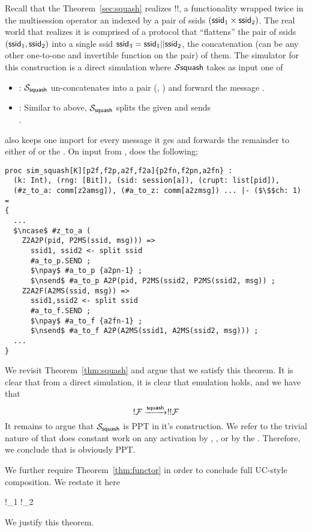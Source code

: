 Recall that the Theorem~\ref{sec:squash} realizes !!\F, a functionality wrapped twice in the multisession operator an indexed by a pair of ssids $(\mathsf{ssid}_1 \times \mathsf{ssid}_2)$.
The real world that realizes it is comprised of a protocol that ``flattens'' the pair of ssids $(\mathsf{ssid}_1, \mathsf{ssid}_2)$ into a single ssid $\mathsf{ssid}_3 = \mathsf{ssid}_1 || \mathsf{ssid}_2$, the concatenation (can be any other one-to-one and invertible function on the pair) of them.
The simulator for this construction is a direct simulation where $\mathcal{S}{\mathsf{squash}}$ takes as input one of 
\begin{itemize}
	\item {}: $\mathcal{S}_{\mathsf{squash}}$ un-concatenates  into a pair (, ) and forward the message .
	\item {}: Similar to above, $\mathcal{S}_{\mathsf{squash}}$ splits the given  and sends \\ . 
\end{itemize}

 also keeps one import for every message it ges and forwards the remainder to either of \F or the \partywrapper.
On input from \Z,  does the following; 

\begin{lstlisting}[basicstyle=\footnotesize\BeraMonottFamily, frame=single, mathescape]
proc sim_squash[K][p2f,f2p,a2f,f2a]{p2fn,f2pn,a2fn} :
  (k: Int), (rng: [Bit]), (sid: session[a]), (crupt: list[pid]),
  (#z_to_a: comm[z2amsg]), (#a_to_z: comm[a2zmsg]) ... |- ($\$$ch: 1) =
{
  ...
  $\ncase$ #z_to_a (
    Z2A2P(pid, P2MS(ssid, msg))) =>
      ssid1, ssid2 <- split ssid
      #a_to_p.SEND ;
      $\npay$ #a_to_p {a2pn-1} ;
      $\nsend$ #a_to_p A2P(pid, P2MS(ssid2, P2MS(ssid2, msg)) ;
    Z2A2F(A2MS(ssid, msg)) =>
      ssid1,ssid2 <- split ssid
      #a_to_f.SEND ; 
      $\npay$ #a_to_f {a2fn-1} ;
	  $\nsend$ #a_to_f A2P(A2MS(ssid1, A2MS(ssid2, msg))) ;
  ...
}	  
\end{lstlisting}

We revisit Theorem~\ref{thm:squash} and argue that we satisfy this theorem. 
It is clear that from a direct simulation, it is clear that emulation holds, and we have that 
\[
	!\mathcal{F} \xrightarrow{\mathsf{squash}} !!\mathcal{F}
\] 
It remains to argue that $\mathcal{S}_{\mathsf{squash}}$ is PPT in it's construction. We refer to the trivial nature of  that does constant work on any activation by \F, \Z, or by the \partywrapper. Therefore, we conclude that  is obviously PPT.

We further require Theorem~\ref{thm:functor} in order to conclude full UC-style composition. We restate it here
\begin{theorem}\label{thm:functor}
	\begin{mathpar}
		{
			!\F_1 \xrightarrow{!\pi} !\F_2
		}
	\end{mathpar}
\end{theorem}

We justify this theorem. 

